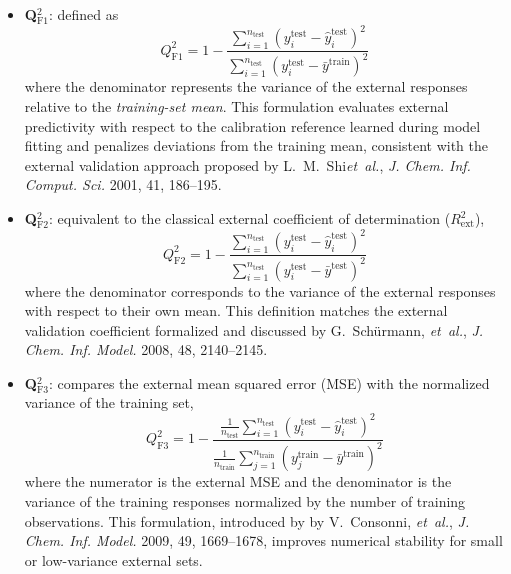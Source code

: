 \documentclass[11pt,a4paper]{article}
\begin{document}
\begin{itemize}

  \item \textbf{Q$^2_{\mathrm{F1}}$}: defined as
  \[
  Q^2_{\mathrm{F1}}
  =
  1 -
  \frac{
  \sum_{i=1}^{n_{\mathrm{test}}}
  \left(y_i^{\mathrm{test}} - \hat{y}_i^{\mathrm{test}}\right)^2
  }{
  \sum_{i=1}^{n_{\mathrm{test}}}
  \left(y_i^{\mathrm{test}} - \bar{y}^{\mathrm{train}}\right)^2
  }
  \]
  where the denominator represents the variance of the external responses relative to the \emph{training-set mean}. This formulation evaluates external predictivity with respect to the calibration reference learned during model fitting and penalizes deviations from the training mean, consistent with the external validation approach proposed by L.~M.~Shi\emph{et~al.}, \emph{J. Chem. Inf. Comput. Sci.} 2001, 41, 186--195.

  \item \textbf{Q$^2_{\mathrm{F2}}$}: equivalent to the classical external coefficient of determination ($R^2_{\mathrm{ext}}$),
  \[
  Q^2_{\mathrm{F2}}
  =
  1 -
  \frac{
  \sum_{i=1}^{n_{\mathrm{test}}}
  \left(y_i^{\mathrm{test}} - \hat{y}_i^{\mathrm{test}}\right)^2
  }{
  \sum_{i=1}^{n_{\mathrm{test}}}
  \left(y_i^{\mathrm{test}} - \bar{y}^{\mathrm{test}}\right)^2
  }
  \]
  where the denominator corresponds to the variance of the external responses with respect to their own mean. This definition matches the external validation coefficient formalized and discussed by G.~Sch\"{u}rmann, \emph{et~al.}, \emph{J. Chem. Inf. Model.} 2008, 48, 2140--2145.

  \item \textbf{Q$^2_{\mathrm{F3}}$}: compares the external mean squared error (MSE) with the normalized variance of the training set,
  \[
  Q^2_{\mathrm{F3}}
  =
  1 -
  \frac{
  \displaystyle \frac{1}{n_{\mathrm{test}}}
  \sum_{i=1}^{n_{\mathrm{test}}}
  \left(y_i^{\mathrm{test}} - \hat{y}_i^{\mathrm{test}}\right)^2
  }{
  \displaystyle \frac{1}{n_{\mathrm{train}}}
  \sum_{j=1}^{n_{\mathrm{train}}}
  \left(y_j^{\mathrm{train}} - \bar{y}^{\mathrm{train}}\right)^2
  }
  \]
  where the numerator is the external MSE and the denominator is the variance of the training responses normalized by the number of training observations. This formulation, introduced by by V.~Consonni, \emph{et~al.}, \emph{J. Chem. Inf. Model.} 2009, 49, 1669--1678, improves numerical stability for small or low-variance external sets.

\end{itemize}
\end{document}
